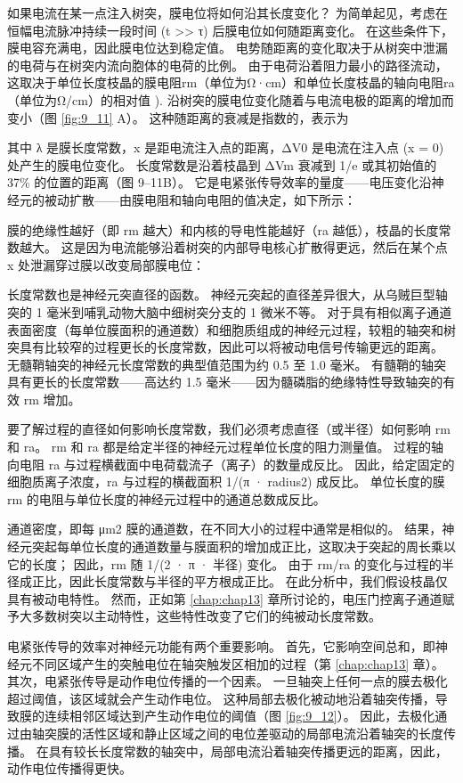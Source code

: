如果电流在某一点注入树突，膜电位将如何沿其长度变化？ 
为简单起见，考虑在恒幅电流脉冲持续一段时间 (t >> τ) 后膜电位如何随距离变化。 
在这些条件下，膜电容充满电，因此膜电位达到稳定值。 电势随距离的变化取决于从树突中泄漏的电荷与在树突内流向胞体的电荷的比例。 
由于电荷沿着阻力最小的路径流动，这取决于单位长度枝晶的膜电阻rm（单位为Ω·cm）和单位长度枝晶的轴向电阻ra（单位为Ω/cm）的相对值 ). 
沿树突的膜电位变化随着与电流电极的距离的增加而变小（图 \ref{fig:9_11} A）。 
这种随距离的衰减是指数的，表示为


其中 λ 是膜长度常数，x 是距电流注入点的距离，ΔV0 是电流在注入点 (x = 0) 处产生的膜电位变化。 
长度常数是沿着枝晶到 ΔVm 衰减到 1/e 或其初始值的 37\% 的位置的距离（图 9–11B）。 
它是电紧张传导效率的量度——电压变化沿神经元的被动扩散——由膜电阻和轴向电阻的值决定，如下所示：


膜的绝缘性越好（即 rm 越大）和内核的导电性能越好（ra 越低），枝晶的长度常数越大。 
这是因为电流能够沿着树突的内部导电核心扩散得更远，然后在某个点 x 处泄漏穿过膜以改变局部膜电位：


长度常数也是神经元突直径的函数。 
神经元突起的直径差异很大，从乌贼巨型轴突的 1 毫米到哺乳动物大脑中细树突分支的 1 微米不等。 
对于具有相似离子通道表面密度（每单位膜面积的通道数）和细胞质组成的神经元过程，较粗的轴突和树突具有比较窄的过程更长的长度常数，因此可以将被动电信号传输更远的距离。 
无髓鞘轴突的神经元长度常数的典型值范围为约 0.5 至 1.0 毫米。 
有髓鞘的轴突具有更长的长度常数——高达约 1.5 毫米——因为髓磷脂的绝缘特性导致轴突的有效 rm 增加。


要了解过程的直径如何影响长度常数，我们必须考虑直径（或半径）如何影响 rm 和 ra。 
rm 和 ra 都是给定半径的神经元过程单位长度的阻力测量值。 
过程的轴向电阻 ra 与过程横截面中电荷载流子（离子）的数量成反比。 
因此，给定固定的细胞质离子浓度，ra 与过程的横截面积 1/(π · radius2) 成反比。 
单位长度的膜 rm 的电阻与单位长度的神经元过程中的通道总数成反比。


通道密度，即每 μm2 膜的通道数，在不同大小的过程中通常是相似的。 
结果，神经元突起每单位长度的通道数量与膜面积的增加成正比，这取决于突起的周长乘以它的长度； 
因此，rm 随 1/(2 · π · 半径) 变化。 
由于 rm/ra 的变化与过程的半径成正比，因此长度常数与半径的平方根成正比。 
在此分析中，我们假设枝晶仅具有被动电特性。 
然而，正如第 \ref{chap:chap13} 章所讨论的，电压门控离子通道赋予大多数树突以主动特性，这些特性改变了它们的纯被动长度常数。


电紧张传导的效率对神经元功能有两个重要影响。 
首先，它影响空间总和，即神经元不同区域产生的突触电位在轴突触发区相加的过程（第 \ref{chap:chap13} 章）。 
其次，电紧张传导是动作电位传播的一个因素。 
一旦轴突上任何一点的膜去极化超过阈值，该区域就会产生动作电位。 
这种局部去极化被动地沿着轴突传播，导致膜的连续相邻区域达到产生动作电位的阈值（图 \ref{fig:9_12}）。 
因此，去极化通过由轴突膜的活性区域和静止区域之间的电位差驱动的局部电流沿着轴突的长度传播。 
在具有较长长度常数的轴突中，局部电流沿着轴突传播更远的距离，因此，动作电位传播得更快。

